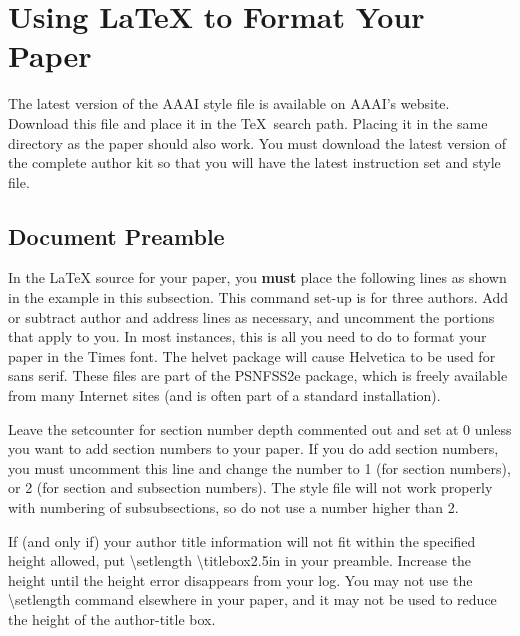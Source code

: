 \documentclass[letterpaper]{article}
\begin{document}
\section{Using \LaTeX{} to Format Your Paper}

The latest version of the AAAI style file is available on AAAI's website. Download this file and place it in  the \TeX\ search path. Placing it in the same directory as the paper should also work. You must download the latest version of the complete author kit so that you will have the latest instruction set and style file.

\subsection{Document Preamble}

In the \LaTeX{} source for your paper, you \textbf{must} place the following lines as shown in the example in this subsection. This command set-up is for three authors. Add or subtract author and address lines as necessary, and uncomment the portions that apply to you. In most instances, this is all you need to do to format your paper in the Times font. The helvet package will cause Helvetica to be used for sans serif. These files are part of the PSNFSS2e package, which is freely available from many Internet sites (and is often part of a standard installation).

Leave the setcounter for section number depth commented out and set at 0 unless you want to add section numbers to your paper. If you do add section numbers, you must uncomment this line and change the number to 1 (for section numbers), or 2 (for section and subsection numbers). The style file will not work properly with numbering of subsubsections, so do not use a number higher than 2.

If (and only if) your author title information will not fit within the specified  height allowed, put \textbackslash setlength \textbackslash titlebox{2.5in} in your preamble. Increase the height until the height error disappears from your log. You may not use the  \textbackslash setlength command elsewhere in your paper, and it may not be used to reduce the height of the author-title box.
\end{document}

